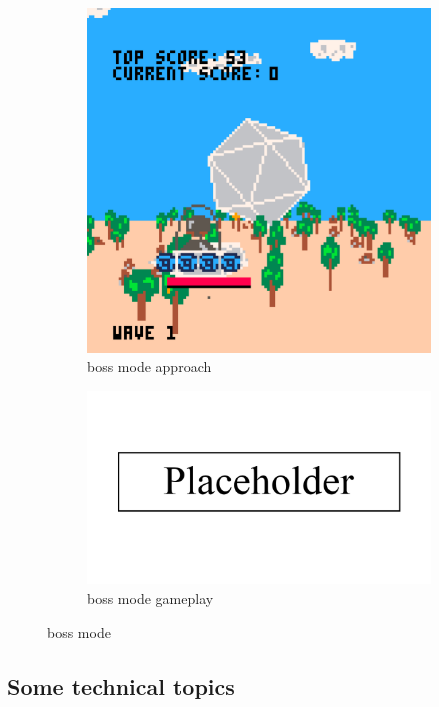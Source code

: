 \documentclass{article}
\begin{document}
\begin{figure}[h]
\begin{subfigure}{.5\textwidth}
  \centering
  \includegraphics[width=.8\linewidth]{boss1}
  \caption{boss mode approach}
  \label{fig:bossfig1}
\end{subfigure}
\begin{subfigure}{.5\textwidth}
  \centering
  \includegraphics[width=.8\linewidth]{placeholder}
  \caption{boss mode gameplay}
  \label{fig:bossfig2}
\end{subfigure}
\caption{boss mode}
\label{fig:boss}
\end{figure}

\subsection{Some technical topics}
\end{document}
